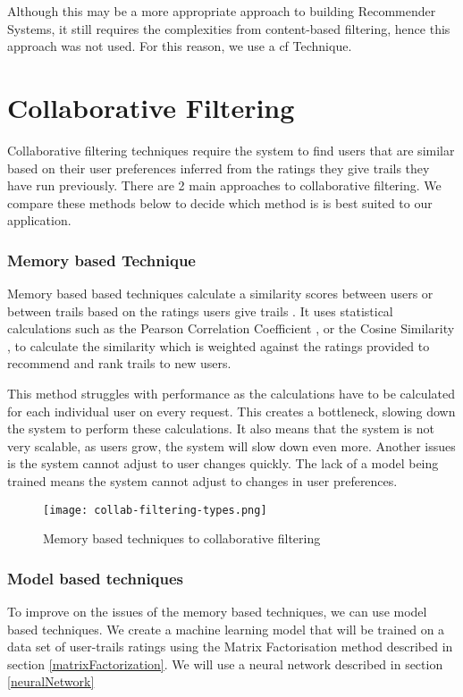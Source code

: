 Although this may be a more appropriate approach to building Recommender Systems, it still requires the complexities from content-based filtering, hence this approach was not used. For this reason, we use a \acrlong{cf} Technique.

\section{Collaborative Filtering}
Collaborative filtering techniques require the system to find users that are similar based on their user preferences inferred from the ratings they give trails they have run previously. There are 2 main approaches to collaborative filtering. We compare these methods below to decide which method is is best suited to our application.

\subsubsection{Memory based Technique}
Memory based based techniques calculate a similarity scores between users or between trails based on the ratings users give trails  \cite{wang2006unifying}. It uses statistical calculations such as the Pearson Correlation Coefficient \cite{benesty2009pearson}, or the Cosine Similarity \cite{michie1994machine}, to calculate the similarity which is weighted against the ratings provided to recommend and rank trails to new users.

This method struggles with performance as the calculations have to be calculated for each individual user on every request. This creates a bottleneck, slowing down the system to perform these calculations. It also means that the system is not very scalable, as users grow, the system will slow down even more. Another issues is the system cannot adjust to user changes quickly. The lack of a model being trained means the system cannot adjust to changes in user preferences.

\begin{figure}[htb!]
    \centering
    \texttt{[image: collab-filtering-types.png]}
    \caption{Memory based techniques to collaborative filtering \cite{collabFilteringTypes}}
    \label{fig:collabFilteringTypes}
\end{figure}

\subsubsection{Model based techniques}
To improve on the issues of the memory based techniques, we can use model based techniques. We create a machine learning model that will be trained on a data set of user-trails ratings using the Matrix Factorisation method described in section \ref{matrixFactorization}. We will use a neural network described in section \ref{neuralNetwork}

